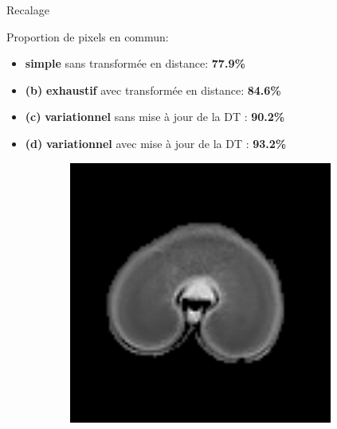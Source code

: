 \documentclass[10pt]{beamer}
\begin{document}
\begin{frame}{Recalage}

  \vspace{-0.3cm}
  Proportion de pixels en commun:
  \begin{itemize}
  \item \textbf{simple} sans transformée en distance: \textbf{77.9\%}
  \item \textbf{(b)} \textbf{exhaustif} avec transformée en distance: \textbf{84.6\%}
  \item \textbf{(c)} \textbf{variationnel} sans mise à jour de la DT : \textbf{90.2\%}
  \item \textbf{(d)} \textbf{variationnel} avec mise à jour de la DT : \textbf{93.2\%}
  \end{itemize}

  \begin{figure}[ht]
  \centering
  \begin{subfigure}[t]{0.25\textwidth}
    \centering
    \includegraphics[width=0.95\textwidth]{fig/registration_wheat_mri}
    \caption{}
    \label{subfig:registration_wheat_mri}
  \end{subfigure}%
  \begin{subfigure}[t]{0.25\textwidth}
    \centering

\end{subfigure}
\end{figure}
\end{frame}
\end{document}
